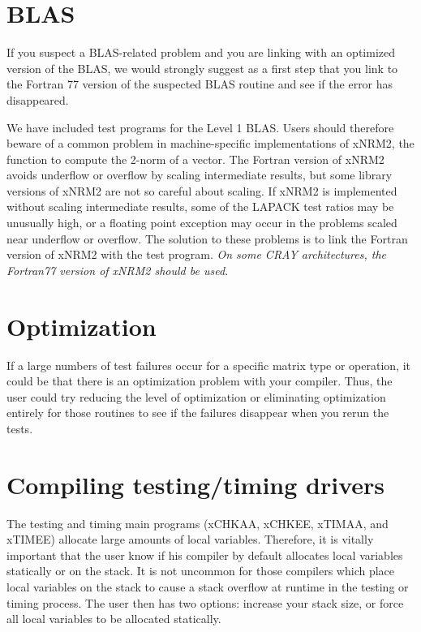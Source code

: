\documentclass[11pt]{report}
\begin{document}
\section{BLAS}

If you suspect a BLAS-related problem and you are linking
with an optimized version of the BLAS, we would strongly suggest
as a first step that you link to the Fortran 77 version of
the suspected BLAS routine and see if the error has disappeared.

We have included test programs for the Level 1 BLAS.
Users should therefore beware of a common problem in machine-specific
implementations of xNRM2,
the function to compute the 2-norm of a vector.
The Fortran version of xNRM2 avoids underflow or overflow
by scaling intermediate results, but some library versions of xNRM2
are not so careful about scaling.
If xNRM2 is implemented without scaling intermediate results, some of
the LAPACK test ratios may be unusually high, or
a floating point exception may occur in the problems scaled near
underflow or overflow.
The solution to these problems is to link the Fortran version of
xNRM2 with the test program.  \emph{On some CRAY architectures, the Fortran77
version of xNRM2 should be used.}

\section{Optimization}

If a large numbers of test failures occur for a specific matrix type
or operation, it could be that there is an optimization problem with
your compiler.  Thus, the user could try reducing the level of
optimization or eliminating optimization entirely for those routines
to see if the failures disappear when you rerun the tests.


\section{Compiling testing/timing drivers}

The testing and timing main programs (xCHKAA, xCHKEE, xTIMAA, and
xTIMEE)
allocate large amounts of local variables.  Therefore, it is vitally
important that the user know if his compiler by default allocates local
variables statically or on the stack.  It is not uncommon for those
compilers which place local variables on the stack to cause a stack
overflow at runtime in the testing or timing process.  The user then
has two options:  increase your stack size, or force all local variables
to be allocated statically.
\end{document}
